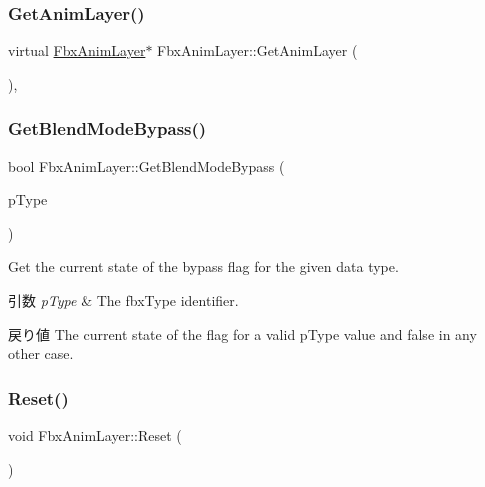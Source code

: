 \subsubsection{\texorpdfstring{Get\+Anim\+Layer()}{GetAnimLayer()}}
{\footnotesize\ttfamily virtual \hyperlink{class_fbx_anim_layer}{Fbx\+Anim\+Layer}$\ast$ Fbx\+Anim\+Layer\+::\+Get\+Anim\+Layer (\begin{DoxyParamCaption}{ }\end{DoxyParamCaption})\hspace{0.3cm}{\ttfamily [protected]}, {\ttfamily [virtual]}}

\mbox{\label{class_fbx_anim_layer_a3f16ece7c4506b8d72c2b77db5e81586}} 
\subsubsection{\texorpdfstring{Get\+Blend\+Mode\+Bypass()}{GetBlendModeBypass()}}
{\footnotesize\ttfamily bool Fbx\+Anim\+Layer\+::\+Get\+Blend\+Mode\+Bypass (\begin{DoxyParamCaption}\item[{\hyperlink{fbxpropertytypes_8h_a73913a5ddfb20e57c6f25e9e6784bd92}{E\+Fbx\+Type}}]{p\+Type }\end{DoxyParamCaption})}

Get the current state of the bypass flag for the given data type. 
\begin{DoxyParams}{引数}
{\em p\+Type} & The fbx\+Type identifier. \\
\hline
\end{DoxyParams}
\begin{DoxyReturn}{戻り値}
The current state of the flag for a valid p\+Type value and {\ttfamily false} in any other case. 
\end{DoxyReturn}
\mbox{\label{class_fbx_anim_layer_acd87646f48b6387952fd3ca257133774}} 
\subsubsection{\texorpdfstring{Reset()}{Reset()}}
{\footnotesize\ttfamily void Fbx\+Anim\+Layer\+::\+Reset (\begin{DoxyParamCaption}{ }\end{DoxyParamCaption})}




